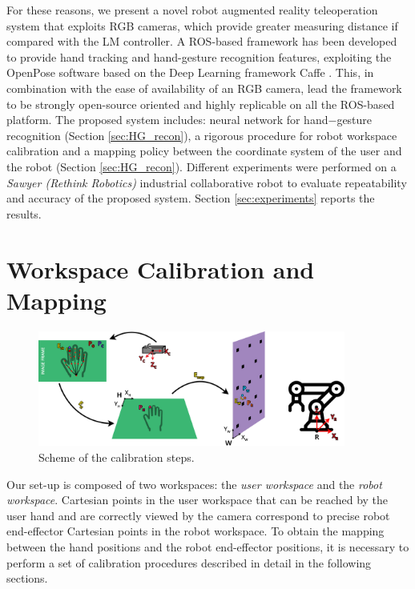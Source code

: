 \documentclass[letterpaper, 10 pt, conference]{ieeeconf}  %
\begin{document}
For these reasons, we present a novel robot augmented reality teleoperation system that exploits RGB cameras, which provide greater measuring distance if compared with the LM controller. A ROS-based framework has been developed to provide hand tracking and hand-gesture recognition features, exploiting the OpenPose software \cite{simon2017hand, cao2018openpose} based on the Deep Learning framework Caffe \cite{jia2014caffe}.
This, in combination with the ease of availability of an RGB camera, lead the framework to be strongly open-source oriented and highly replicable on all the ROS-based platform. The proposed system includes: neural network for hand$-$gesture recognition (Section \ref{sec:HG_recon}), a rigorous procedure for robot workspace calibration and a mapping policy between the coordinate system of the user and the robot (Section \ref{sec:HG_recon}). 
Different experiments were performed on a \textit{Sawyer (Rethink Robotics)} industrial collaborative robot to evaluate repeatability and accuracy of the proposed system. Section \ref{sec:experiments} reports the results.

\section{Workspace Calibration and Mapping} \label{sec:calib}
\begin{figure}[h]
\centering
  \includegraphics[width=0.9\textwidth]{figures/horizcalib.png}
  \caption{Scheme of the calibration steps.}
  \label{fig:wscalib}
\end{figure}
Our set-up is composed of two workspaces: the \textit{user workspace} and the \textit{robot workspace}. Cartesian points in the user workspace that can be reached by the user hand and are correctly viewed by the camera correspond to precise robot end-effector Cartesian points in the robot workspace. To obtain the mapping between the hand positions and the robot end-effector positions, it is necessary to perform a set of calibration procedures described in detail in the following sections.
\end{document}
